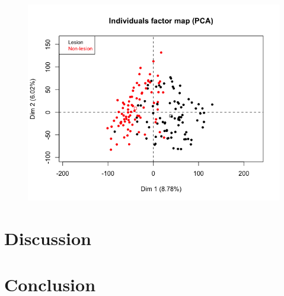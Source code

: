 \documentclass[journal, a4paper]{IEEEtran}
\begin{document}
\begin{figure}[!htp]
  \centering
  \includegraphics{../exploratory-data-analysis/pca-plot.png}
  \label{test}
\end{figure}

\section{Discussion}

\section{Conclusion}




\end{document}
